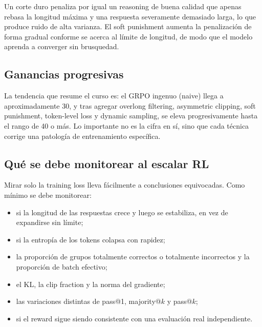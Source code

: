 Un corte duro penaliza por igual un reasoning de buena calidad que apenas rebasa la longitud máxima y una respuesta severamente demasiado larga, lo que produce ruido de alta varianza. El soft punishment aumenta la penalización de forma gradual conforme se acerca al límite de longitud, de modo que el modelo aprenda a converger sin brusquedad.


\subsection{Ganancias progresivas}


La tendencia que resume el curso es: el GRPO ingenuo (naive) llega a aproximadamente 30, y tras agregar overlong filtering, asymmetric clipping, soft punishment, token-level loss y dynamic sampling, se eleva progresivamente hasta el rango de 40 o más. Lo importante no es la cifra en sí, sino que cada técnica corrige una patología de entrenamiento específica.

\subsection{Qué se debe monitorear al escalar RL}


Mirar solo la training loss lleva fácilmente a conclusiones equivocadas. Como mínimo se debe monitorear:

\begin{itemize}
    \item si la longitud de las respuestas crece y luego se estabiliza, en vez de expandirse sin límite;
    \item si la entropía de los tokens colapsa con rapidez;
    \item la proporción de grupos totalmente correctos o totalmente incorrectos y la proporción de batch efectivo;
    \item el KL, la clip fraction y la norma del gradiente;
    \item las variaciones distintas de pass@1, majority@$k$ y pass@$k$;
    \item si el reward sigue siendo consistente con una evaluación real independiente.
\end{itemize}


